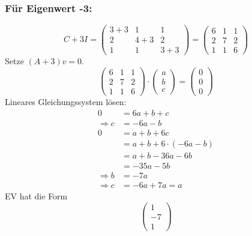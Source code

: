 \documentclass{article} %
\begin{document}
\subsubsection*{Für Eigenwert -3:}
\[
C + 3 I = \begin{pmatrix}
3+3&1&1\\
2&4+3&2\\
1&1&3+3
\end{pmatrix}
 = \begin{pmatrix}
6&1&1\\
2&7&2\\
1&1&6
\end{pmatrix}
\]
Setze $(A + 3)v = 0$.
\[
\begin{pmatrix}
6&1&1\\
2&7&2\\
1&1&6
\end{pmatrix} \cdot \begin{pmatrix}
a \\ b\\c
\end{pmatrix} = \begin{pmatrix}
0\\0\\0
\end{pmatrix}
\]
Lineares Gleichungssystem lösen: 
\begin{align*}
            0 & =  6a+b+c \\
\Rightarrow c & = -6a-b \\
            0 & = a+b+6c \\
              & = a+b+6\cdot(-6a-b) \\
              & = a+b-36a-6b\\
              & = -35a-5b \\
\Rightarrow b & = -7a \\ 
\Rightarrow c & = -6a+7a = a 
\end{align*}
EV hat die Form
\[
\begin{pmatrix}
1 \\ -7\\1
\end{pmatrix}
\]
\end{document}
